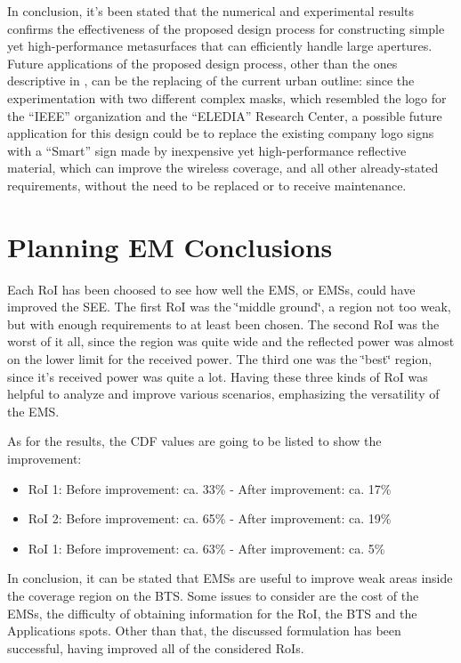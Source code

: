 In conclusion, it's been stated that the numerical and experimental
results confirms the effectiveness of the proposed design process
for constructing simple yet high-performance metasurfaces that can
efficiently handle large apertures. Future applications of the proposed
design process, other than the ones descriptive in \cite{Oliveri:2021},
can be the replacing of the current urban outline: since the experimentation
with two different complex masks, which resembled the logo for the
{}``IEEE'' organization and the {}``ELEDIA'' Research Center,
a possible future application for this design could be to replace
the existing company logo signs with a {}``Smart'' sign made by
inexpensive yet high-performance reflective material, which can improve
the wireless coverage, and all other already-stated requirements,
without the need to be replaced or to receive maintenance.

\section{Planning EM Conclusions}
Each RoI has been choosed to see how well the EMS, or EMSs, could
have improved the SEE. The first RoI was the \char`\"{}middle ground\char`\"{},
a region not too weak, but with enough requirements to at least been
chosen. The second RoI was the worst of it all, since the region was
quite wide and the reflected power was almost on the lower limit for
the received power. The third one was the \char`\"{}best\char`\"{}
region, since it's received power was quite a lot. Having these three
kinds of RoI was helpful to analyze and improve various scenarios,
emphasizing the versatility of the EMS. 

As for the results, the CDF values are going to be listed to show
the improvement:

\begin{itemize}
\item RoI 1: Before improvement: ca. 33\% - After improvement: ca. 17\%
\item RoI 2: Before improvement: ca. 65\% - After improvement: ca. 19\%
\item RoI 1: Before improvement: ca. 63\% - After improvement: ca. 5\%
\end{itemize}
In conclusion, it can be stated that EMSs are useful to improve weak
areas inside the coverage region on the BTS. Some issues to consider
are the cost of the EMSs, the difficulty of obtaining information
for the RoI, the BTS and the Applications spots. Other than that,
the discussed formulation has been successful, having improved all
of the considered RoIs. 

